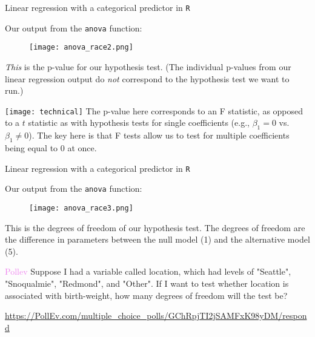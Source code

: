 \documentclass[10pt,t]{beamer}
\begin{document}
\begin{frame}{Linear regression with a categorical predictor in \texttt{R}}
	\vspace{-5mm}
	
Our output from the \texttt{anova} function:

\vspace{0.15cm}

\begin{figure}
	\centering \texttt{[image: anova\_race2.png]}
\end{figure}

\vspace{0.15cm}

\textit{This} is the p-value for our hypothesis test. (The individual p-values from our linear regression output do \textit{not} correspond to the hypothesis test we want to run.) \pause

\vspace{0.3cm}


\texttt{[image: technical]} The p-value here corresponds to an F statistic, as opposed to a $t$ statistic as with hypothesis tests for single coefficients (e.g., $\beta_1 = 0$ vs. $\beta_1 \neq 0$). The key here is that F tests allow us to test for multiple coefficients being equal to $0$ at once.

\end{frame}

\begin{frame}{Linear regression with a categorical predictor in \texttt{R}}
	\vspace{-5mm}
	
	Our output from the \texttt{anova} function:
	
	\vspace{0.15cm}
	
	\begin{figure}
		\centering \texttt{[image: anova\_race3.png]}
	\end{figure}
	
	\vspace{0.15cm}
	
This is the degrees of freedom of our hypothesis test. The degrees of freedom are the difference in parameters between the null model (1) and the alternative model (5).
	

	
\end{frame}

\begin{frame}{\textcolor{violet}{Pollev}}
	Suppose I had a variable called location, which had levels of "Seattle", "Snoqualmie", "Redmond", and "Other". If I want to test whether location is associated with birth-weight, how many degrees of freedom will the test be? %
	
		\url{https://PollEv.com/multiple_choice_polls/GChRpjTI2jSAMFxK98yDM/respond}
	
	
\end{frame}
\end{document}
